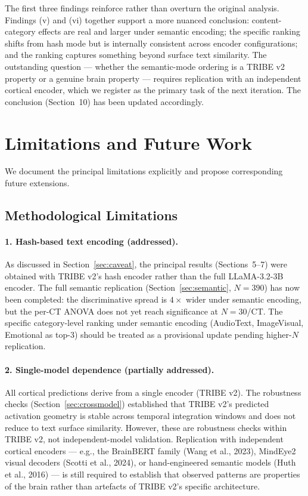 \documentclass[11pt,letterpaper]{article}
\begin{document}
The first three findings reinforce rather than overturn the original analysis. Findings (v) and (vi) together support a more nuanced conclusion: content-category effects are real and larger under semantic encoding; the specific ranking shifts from hash mode but is internally consistent across encoder configurations; and the ranking captures something beyond surface text similarity. The outstanding question --- whether the semantic-mode ordering is a TRIBE v2 property or a genuine brain property --- requires replication with an independent cortical encoder, which we register as the primary task of the next iteration. The conclusion (Section~10) has been updated accordingly.

\FloatBarrier
\clearpage
\section{Limitations and Future Work}

We document the principal limitations explicitly and propose corresponding future extensions.

\subsection{Methodological Limitations}

\paragraph{1. Hash-based text encoding (addressed).} As discussed in Section~\ref{sec:caveat}, the principal results (Sections~5--7) were obtained with TRIBE v2's hash encoder rather than the full LLaMA-3.2-3B encoder. The full semantic replication (Section~\ref{sec:semantic}, $N=390$) has now been completed: the discriminative spread is $4\times$ wider under semantic encoding, but the per-CT ANOVA does not yet reach significance at $N=30$/CT. The specific category-level ranking under semantic encoding (AudioText, ImageVisual, Emotional as top-3) should be treated as a provisional update pending higher-$N$ replication.

\paragraph{2. Single-model dependence (partially addressed).} All cortical predictions derive from a single encoder (TRIBE v2). The robustness checks (Section~\ref{sec:crossmodel}) established that TRIBE v2's predicted activation geometry is stable across temporal integration windows and does not reduce to text surface similarity. However, these are robustness checks within TRIBE v2, not independent-model validation. Replication with independent cortical encoders --- e.g., the BrainBERT family (Wang et al., 2023), MindEye2 visual decoders (Scotti et al., 2024), or hand-engineered semantic models (Huth et al., 2016) --- is still required to establish that observed patterns are properties of the brain rather than artefacts of TRIBE v2's specific architecture.
\end{document}
